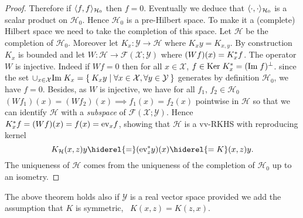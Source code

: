 \begin{proof}
Therefore if $\langle f,f\rangle_{\mathcal{H}_0}$ then $f=0$. Eventually we deduce that $\langle\cdot,\cdot\rangle_{\mathcal{H}_0}$ is a scalar product on $\mathcal{H}_0$. Hence $\mathcal{H}_0$ is a pre-Hilbert space. To make it a (complete) Hilbert space we need to take the completion of this space. Let $\mathcal{H}$ be the completion of $\mathcal{H}_0$. Moreover let $K_x:\mathcal{Y}\to\mathcal{H}$ where $K_xy=K_{x,y}$. By construction $K_x$ is bounded and let $W:\mathcal{H}\to\mathcal{F}(\mathcal{X};\mathcal{Y})$ where $(Wf)(x)=K_x^* f$. The operator $W$ is injective. Indeed if $Wf=0$ then for all $x\in\mathcal{X}$, $f\in\text{Ker}\; K_x^*=(\text{Im}\; f)^{\bot}$. since the set $\cup_{x\in\mathcal{X}}\text{Im}\; K_x=\Set{K_xy|\forall x\in\mathcal{X}, \forall y\in\mathcal{Y}}$ generates by definition $\mathcal{H}_0$, we have $f=0$. Besides, as $W$ is injective, we have for all $f_1$, $f_2\in\mathcal{H}_0$ $(Wf_1)(x)=(Wf_2)(x){\scriptstyle\implies} f_1(x)=f_2(x)$ pointwise in $\mathcal{H}$ so that we can identify $\mathcal{H}$ with a \emph{subspace} of $\mathcal{F}(\mathcal{X};\mathcal{Y})$. Hence $K_x^* f=(Wf)(x)=f(x)=\text{ev}_xf$, showing that $\mathcal{H}$ is a \acl{vv-RKHS} with reproducing kernel
\begin{dmath*}
K_{\mathcal{H}}(x,z)y\hiderel{=}(\text{ev}^\adjoint_zy)(x)\hiderel{=K}(x,z)y.
\end{dmath*}
The uniqueness of $\mathcal{H}$ comes from the uniqueness of the completion of $\mathcal{H}_0$ up to an isometry.
\end{proof}
The above theorem holds also if $\mathcal{Y}$ is a real vector space provided we add the assumption that $K$ is symmetric, \ie~$K(x,z)=K(z,x)$.
